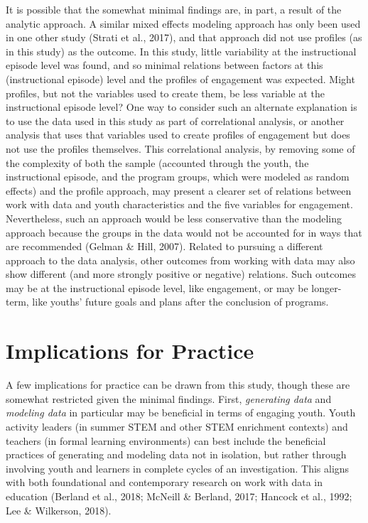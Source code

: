 \documentclass[]{msu-thesis}
\theoremstyle{definition}
\theoremstyle{definition}
\theoremstyle{definition}
\theoremstyle{remark}
\begin{document}
It is possible that the somewhat minimal findings are, in part, a result
of the analytic approach. A similar mixed effects modeling approach has
only been used in one other study (Strati et al., 2017), and that
approach did not use profiles (as in this study) as the outcome. In this
study, little variability at the instructional episode level was found,
and so minimal relations between factors at this (instructional episode)
level and the profiles of engagement was expected. Might profiles, but
not the variables used to create them, be less variable at the
instructional episode level? One way to consider such an alternate
explanation is to use the data used in this study as part of
correlational analysis, or another analysis that uses that variables
used to create profiles of engagement but does not use the profiles
themselves. This correlational analysis, by removing some of the
complexity of both the sample (accounted through the youth, the
instructional episode, and the program groups, which were modeled as
random effects) and the profile approach, may present a clearer set of
relations between work with data and youth characteristics and the five
variables for engagement. Nevertheless, such an approach would be less
conservative than the modeling approach because the groups in the data
would not be accounted for in ways that are recommended (Gelman \& Hill,
2007). Related to pursuing a different approach to the data analysis,
other outcomes from working with data may also show different (and more
strongly positive or negative) relations. Such outcomes may be at the
instructional episode level, like engagement, or may be longer-term,
like youths' future goals and plans after the conclusion of programs.

\section{Implications for Practice}\label{implications-for-practice}

A few implications for practice can be drawn from this study, though
these are somewhat restricted given the minimal findings. First,
\emph{generating data} and \emph{modeling data} in particular may be
beneficial in terms of engaging youth. Youth activity leaders (in summer
STEM and other STEM enrichment contexts) and teachers (in formal
learning environments) can best include the beneficial practices of
generating and modeling data not in isolation, but rather through
involving youth and learners in complete cycles of an investigation.
This aligns with both foundational and contemporary research on work
with data in education (Berland et al., 2018; McNeill \& Berland, 2017;
Hancock et al., 1992; Lee \& Wilkerson, 2018).
\end{document}
